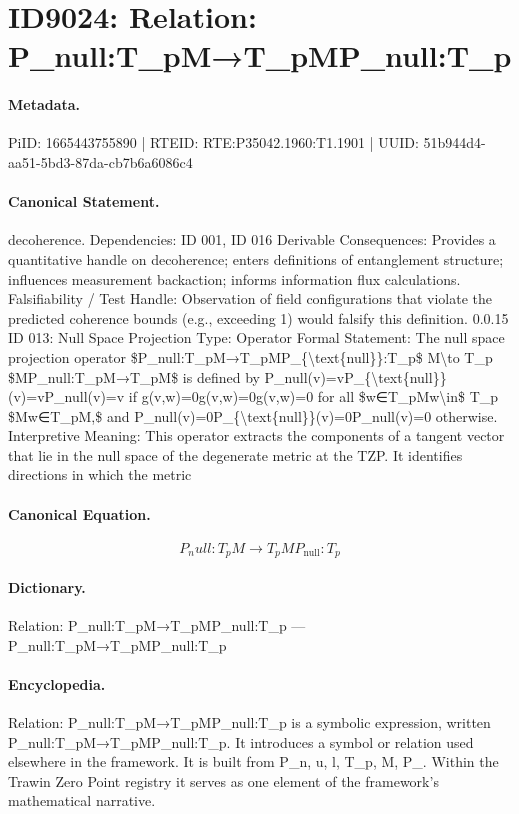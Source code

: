 \section*{ID9024: Relation: P\_null:T\_pM→T\_pMP\_null:T\_p}
\paragraph{Metadata.}
PiID: 1665443755890 | RTEID: RTE:P35042.1960:T1.1901 | UUID: 51b944d4-aa51-5bd3-87da-cb7b6a6086c4

\paragraph{Canonical Statement.}
decoherence. Dependencies: ID 001, ID 016 Derivable Consequences: Provides a quantitative handle on decoherence; enters definitions of entanglement structure; influences measurement backaction; informs information flux calculations. Falsifiability / Test Handle: Observation of field configurations that violate the predicted coherence bounds (e.g., exceeding 1) would falsify this definition. 0.0.15 ID 013: Null Space Projection Type: Operator Formal Statement: The null space projection operator \$P\_null:T\_pM→T\_pMP\_\{\textbackslash{}text\{null\}\}:T\_p\$ M\textbackslash{}to T\_p \$MP\_null:T\_pM→T\_pM\$ is defined by P\_null(v)=vP\_\{\textbackslash{}text\{null\}\}(v)=vP\_null(v)=v if g(v,w)=0g(v,w)=0g(v,w)=0 for all \$w∈T\_pMw\textbackslash{}in\$ T\_p \$Mw∈T\_pM,\$ and P\_null(v)=0P\_\{\textbackslash{}text\{null\}\}(v)=0P\_null(v)=0 otherwise. Interpretive Meaning: This operator extracts the components of a tangent vector that lie in the null space of the degenerate metric at the TZP. It identifies directions in which the metric

\paragraph{Canonical Equation.}
\[
P_null:T_pM→T_pMP_{\text{null}}:T_p
\]

\paragraph{Dictionary.}
Relation: P\_null:T\_pM→T\_pMP\_null:T\_p — P\_null:T\_pM→T\_pMP\_null:T\_p

\paragraph{Encyclopedia.}
Relation: P\_null:T\_pM→T\_pMP\_null:T\_p is a symbolic expression, written P\_null:T\_pM→T\_pMP\_null:T\_p. It introduces a symbol or relation used elsewhere in the framework. It is built from P\_n, u, l, T\_p, M, P\_. Within the Trawin Zero Point registry it serves as one element of the framework's mathematical narrative.
